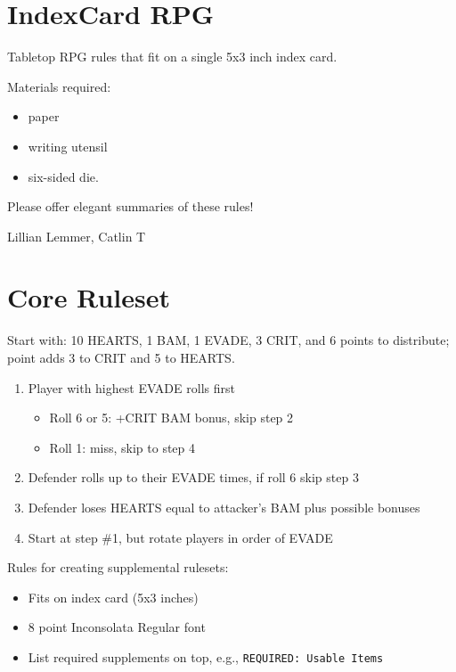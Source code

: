 \section{IndexCard RPG}\label{indexcard-rpg}

Tabletop RPG rules that fit on a single 5x3 inch index card.

Materials required:

\begin{itemize}
\tightlist
\item
  paper
\item
  writing utensil
\item
  six-sided die.
\end{itemize}

Please offer elegant summaries of these rules!

Lillian Lemmer, Catlin T

\section{Core Ruleset}\label{core-ruleset}

Start with: 10 HEARTS, 1 BAM, 1 EVADE, 3 CRIT, and 6 points to
distribute; point adds 3 to CRIT and 5 to HEARTS.

\begin{enumerate}
\def\labelenumi{\arabic{enumi}.}
\item
  Player with highest EVADE rolls first

  \begin{itemize}
  \tightlist
  \item
    Roll 6 or 5: +CRIT BAM bonus, skip step 2
  \item
    Roll 1: miss, skip to step 4
  \end{itemize}
\item
  Defender rolls up to their EVADE times, if roll 6 skip step 3
\item
  Defender loses HEARTS equal to attacker's BAM plus possible bonuses
\item
  Start at step \#1, but rotate players in order of EVADE
\end{enumerate}

Rules for creating supplemental rulesets:

\begin{itemize}
\tightlist
\item
  Fits on index card (5x3 inches)
\item
  8 point Inconsolata Regular font
\item
  List required supplements on top, e.g.,
  \texttt{REQUIRED:\ Usable\ Items}
\end{itemize}

